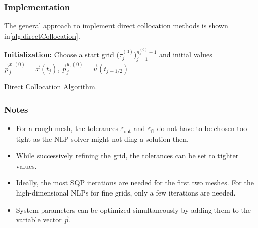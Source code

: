 			\subsubsection{Implementation}
				The general approach to implement direct collocation methods is shown in\autoref{alg:directCollocation}.

				\begin{algorithm}  \DontPrintSemicolon
					\textbf{Initialization:} Choose a start grid \( \big( \tau_j^{(0)} \big)_{j = 1}^{n_s^{(0)} + 1} \) and initial values \( \vec{p}_j^{x, (0)} = \vec{x}(t_j) \), \( \vec{p}_j^{u, (0)} = \vec{u}(t_{j + 1/2}) \) \;

					\caption{Direct Collocation Algorithm.}
					\label{alg:directCollocation}
				\end{algorithm}

			\subsubsection{Notes}
				\begin{itemize}
					\item For a rough mesh, the tolerances \( \varepsilon_{\mathrm{opt}} \) and \( \varepsilon_\mathrm{ft} \) do not have to be chosen too tight as the NLP solver might not ding a solution then.
					\item While successively refining the grid, the tolerances can be set to tighter values.
					\item Ideally, the most SQP iterations are needed for the first two meshes. For the high-dimensional NLPs for fine grids, only a few iterations are needed.
					\item System parameters can be optimized simultaneously by adding them to the variable vector \(\vec{p}\).
				\end{itemize}

